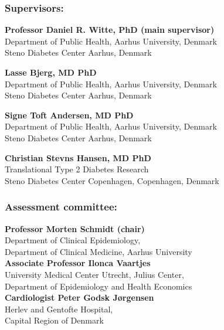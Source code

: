 \documentclass[
  a4paper,
  headsepline=true,
  open=left]{scrbook}
\begin{document}
\hypertarget{supervisors}{%
\subsubsection*{Supervisors:}\label{supervisors}}

\textbf{Professor Daniel R. Witte, PhD (main supervisor)}\\
Department of Public Health, Aarhus University, Denmark\\
Steno Diabetes Center Aarhus, Denmark

\textbf{Lasse Bjerg, MD PhD}\\
Department of Public Health, Aarhus University, Denmark\\
Steno Diabetes Center Aarhus, Denmark

\textbf{Signe Toft Andersen, MD PhD}\\
Department of Public Health, Aarhus University, Denmark\\
Steno Diabetes Center Aarhus, Denmark

\textbf{Christian Stevns Hansen, MD PhD}\\
Translational Type 2 Diabetes Research\\
Steno Diabetes Center Copenhagen, Copenhagen, Denmark

\hypertarget{assessment-committee}{%
\subsubsection*{Assessment committee:}\label{assessment-committee}}

\textbf{Professor Morten Schmidt (chair)}\\
Department of Clinical Epidemiology,\\
Department of Clinical Medicine, Aarhus University\\

\textbf{Associate Professor Ilonca Vaartjes}\\
University Medical Center Utrecht, Julius Center,\\
Department of Epidemiology and Health Economics\\

\textbf{Cardiologist Peter Godsk Jørgensen}\\
Herlev and Gentofte Hospital,\\
Capital Region of Denmark

\end{document}
